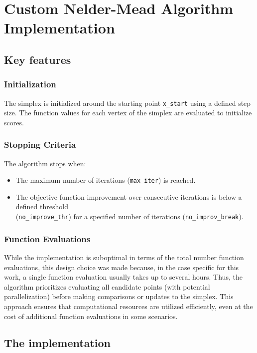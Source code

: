\chapter{Custom Nelder-Mead Algorithm Implementation}\label{appendix B}

\section{Key features}

\subsection*{Initialization}
The simplex is initialized around the starting point \texttt{x\_start} using a defined step size. The function values for each vertex of the simplex are evaluated to initialize scores.

\subsection*{Stopping Criteria}
The algorithm stops when:
\begin{itemize}
	\item The maximum number of iterations (\texttt{max\_iter}) is reached.
	\item The objective function improvement over consecutive iterations is below a defined threshold\\ (\texttt{no\_improve\_thr}) for a specified number of iterations (\texttt{no\_improv\_break}).
\end{itemize}

\subsection*{Function Evaluations}
While the implementation is suboptimal in terms of the total number function evaluations, this design choice was made because, in the case specific for this work, a single function evaluation usually takes up to several hours. Thus, the algorithm prioritizes evaluating all candidate points (with potential parallelization) before making comparisons or updates to the simplex. This approach ensures that computational resources are utilized efficiently, even at the cost of additional function evaluations in some scenarios.

\section{The implementation}

